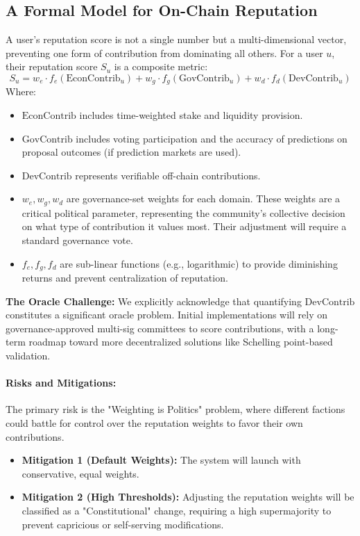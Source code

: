 \documentclass[10pt]{article}
\begin{document}
\subsection{A Formal Model for On-Chain Reputation}
A user's reputation score is not a single number but a multi-dimensional vector, preventing one form of contribution from dominating all others. For a user \(u\), their reputation score \(S_u\) is a composite metric:
\[ S_u = w_e \cdot f_e(\text{EconContrib}_u) + w_g \cdot f_g(\text{GovContrib}_u) + w_d \cdot f_d(\text{DevContrib}_u) \]
Where:
\begin{itemize}[leftmargin=*, itemsep=2pt]
    \item \(\text{EconContrib}\) includes time-weighted stake and liquidity provision.
    \item \(\text{GovContrib}\) includes voting participation and the accuracy of predictions on proposal outcomes (if prediction markets are used).
    \item \(\text{DevContrib}\) represents verifiable off-chain contributions.
    \item \(w_e, w_g, w_d\) are governance-set weights for each domain. These weights are a critical political parameter, representing the community's collective decision on what type of contribution it values most. Their adjustment will require a standard governance vote.
    \item \(f_e, f_g, f_d\) are sub-linear functions (e.g., logarithmic) to provide diminishing returns and prevent centralization of reputation.
\end{itemize}

\textbf{The Oracle Challenge:} We explicitly acknowledge that quantifying \(\text{DevContrib}\) constitutes a significant oracle problem. Initial implementations will rely on governance-approved multi-sig committees to score contributions, with a long-term roadmap toward more decentralized solutions like Schelling point-based validation.

\paragraph{Risks and Mitigations:} The primary risk is the "Weighting is Politics" problem, where different factions could battle for control over the reputation weights to favor their own contributions.
\begin{itemize}[leftmargin=*, itemsep=2pt]
    \item \textbf{Mitigation 1 (Default Weights):} The system will launch with conservative, equal weights.
    \item \textbf{Mitigation 2 (High Thresholds):} Adjusting the reputation weights will be classified as a "Constitutional" change, requiring a high supermajority to prevent capricious or self-serving modifications.
\end{itemize}
\end{document}
